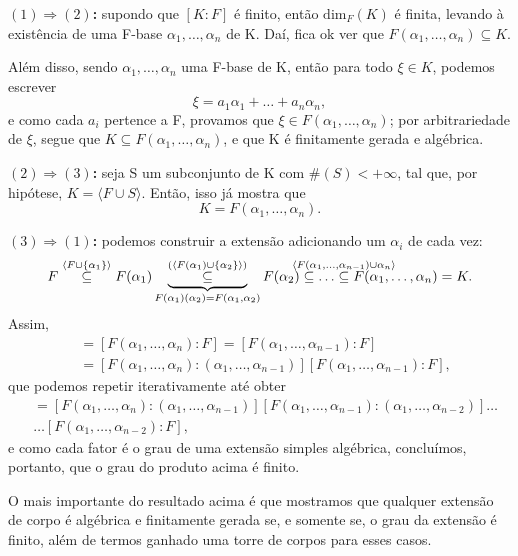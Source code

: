 \documentclass[../algebraIII_notes.tex]{subfiles}
\begin{document}
\begin{proof*}
	\textbf{\((1)\Rightarrow (2)\):} supondo que \([K:F]\) é finito, então \(\mathrm{dim}_{F}(K)\) é finita, levando à existência de uma F-base \(\alpha_1,\dotsc , \alpha_{n}\) de K. Daí, fica ok ver que \(F(\alpha_1,\dotsc , \alpha_n)\subseteq K\).

	Além disso, sendo \( \alpha_1,\dotsc ,\alpha_{n}\) uma F-base de K, então para todo \(\xi \in K\), podemos escrever
	\[
		\xi = a_1\alpha_1 +\dotsc +a_{n}\alpha_{n},
	\]
	e como cada \(a_{i}\) pertence a F, provamos que \(\xi \in F(\alpha_1, \dotsc , \alpha_{n})\); por arbitrariedade de \(\xi \), segue que \(K\subseteq F(\alpha_1,\dotsc ,\alpha_{n})\), e que K é finitamente gerada e algébrica.

	\textbf{\((2)\Rightarrow (3)\):} seja S um subconjunto de K com \(\#(S)<+\infty\), tal que, por hipótese, \(K=\langle F\cup S \rangle\). Então, isso já mostra que
	\[
		K=F(\alpha_1,\dotsc ,\alpha_{n}).
	\]

	\textbf{\((3)\Rightarrow (1)\):} podemos construir a extensão adicionando um \(\alpha_{i}\) de cada vez:
	\[
		F \stackrel{\langle F\cup \{\alpha_1\} \rangle}\subseteq F(\alpha_1)\underbrace{\stackrel{(\langle F(\alpha_1)\cup \{\alpha_2\} \rangle)}\subseteq}_{F(\alpha_1)(\alpha_2)=F(\alpha_1, \alpha_2)} F(\alpha_2)\subseteq \dotsc \stackrel{\mathclap{\langle F(\alpha_1,\dotsc ,\alpha_{n-1})\cup \alpha_{n} \rangle}}\subseteq F(\alpha_1,\dotsc ,\alpha_{n})=K.
	\]
	Assim,
	\begin{align*}
		[K:F] & =[F(\alpha_1,\dotsc ,\alpha_{n}): F]  =[F(\alpha_1,\dotsc ,\alpha_{n-1}): F]                                \\
		      & = [F(\alpha_1, \dotsc , \alpha_{n}):(\alpha_{1},\dotsc ,\alpha_{n-1})][F(\alpha_1,\dotsc ,\alpha_{n-1}):F],
	\end{align*}
	que podemos repetir iterativamente até obter
	\begin{align*}
		[K:F] & = [F(\alpha_1, \dotsc , \alpha_{n}):(\alpha_{1},\dotsc ,\alpha_{n-1})][F(\alpha_1, \dotsc , \alpha_{n-1}):(\alpha_{1},\dotsc ,\alpha_{n-2})]\dotsc \\
		      & \dotsc [F(\alpha_1,\dotsc ,\alpha_{n-2}):F],
	\end{align*}
	e como cada fator é o grau de uma extensão simples algébrica, concluímos, portanto, que o grau do produto acima é finito. \qedsymbol
\end{proof*}
O mais importante do resultado acima é que mostramos que qualquer extensão de corpo é algébrica e finitamente gerada se, e somente se, o grau da extensão é finito, além de termos ganhado uma torre de corpos para esses casos.
\end{document}
